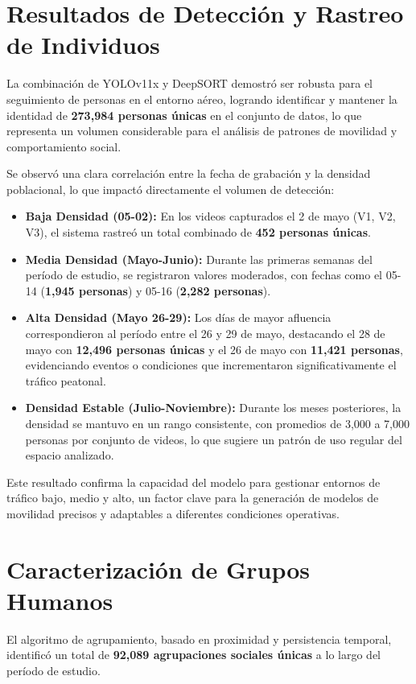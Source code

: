 \section{Resultados de Detección y Rastreo de Individuos}
La combinación de YOLOv11x y DeepSORT demostró ser robusta para el seguimiento de personas en el entorno aéreo, logrando identificar y mantener la identidad de \textbf{273,984 personas únicas} en el conjunto de datos, lo que representa un volumen considerable para el análisis de patrones de movilidad y comportamiento social.

Se observó una clara correlación entre la fecha de grabación y la densidad poblacional, lo que impactó directamente el volumen de detección:

\begin{itemize}
	\item \textbf{Baja Densidad (05-02):} En los videos capturados el 2 de mayo (V1, V2, V3), el sistema rastreó un total combinado de \textbf{452 personas únicas}.
	\item \textbf{Media Densidad (Mayo-Junio):} Durante las primeras semanas del período de estudio, se registraron valores moderados, con fechas como el 05-14 (\textbf{1,945 personas}) y 05-16 (\textbf{2,282 personas}).
	\item \textbf{Alta Densidad (Mayo 26-29):} Los días de mayor afluencia correspondieron al período entre el 26 y 29 de mayo, destacando el 28 de mayo con \textbf{12,496 personas únicas} y el 26 de mayo con \textbf{11,421 personas}, evidenciando eventos o condiciones que incrementaron significativamente el tráfico peatonal.
	\item \textbf{Densidad Estable (Julio-Noviembre):} Durante los meses posteriores, la densidad se mantuvo en un rango consistente, con promedios de 3,000 a 7,000 personas por conjunto de videos, lo que sugiere un patrón de uso regular del espacio analizado.
\end{itemize}

Este resultado confirma la capacidad del modelo para gestionar entornos de tráfico bajo, medio y alto, un factor clave para la generación de modelos de movilidad precisos y adaptables a diferentes condiciones operativas.

\section{Caracterización de Grupos Humanos}
El algoritmo de agrupamiento, basado en proximidad y persistencia temporal, identificó un total de \textbf{92,089 agrupaciones sociales únicas} a lo largo del período de estudio.

